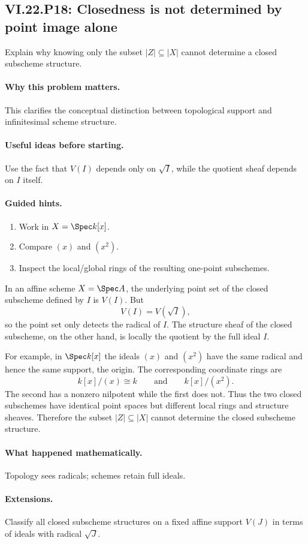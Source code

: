 \subsection*{VI.22.P18: Closedness is not determined by point image alone}
\begin{problem}\label{prob:vi22-p18}
Explain why knowing only the subset $|Z|\subseteq|X|$ cannot determine a closed subscheme structure.
\end{problem}

\ifdefined\FullProblemDossiers
\paragraph{Why this problem matters.}
This clarifies the conceptual distinction between topological support and infinitesimal scheme structure.

\paragraph{Useful ideas before starting.}
Use the fact that $V(I)$ depends only on $\sqrt I$, while the quotient sheaf depends on $I$ itself.

\paragraph{Guided hints.}
\begin{enumerate}
\item Work in $X=\Spec k[x]$.
\item Compare $(x)$ and $(x^2)$.
\item Inspect the local/global rings of the resulting one-point subschemes.
\end{enumerate}

\begin{solution}
In an affine scheme $X=\Spec A$, the underlying point set of the closed
subscheme defined by $I$ is $V(I)$.  But
\[
 V(I)=V(\sqrt I),
\]
so the point set only detects the radical of $I$.  The structure sheaf of the closed subscheme,
on the other hand, is locally the quotient by the full ideal $I$.

For example, in $\Spec k[x]$ the ideals $(x)$ and $(x^2)$ have the same radical and hence the
same support, the origin.  The corresponding coordinate rings are
\[
 k[x]/(x)\cong k
 \qquad\text{and}\qquad
 k[x]/(x^2).
\]
The second has a nonzero nilpotent while the first does not.  Thus the two closed subschemes
have identical point spaces but different local rings and structure sheaves.  Therefore the
subset $|Z|\subseteq|X|$ cannot determine the closed subscheme structure.
\end{solution}

\paragraph{What happened mathematically.}
Topology sees radicals; schemes retain full ideals.

\paragraph{Extensions.}
Classify all closed subscheme structures on a fixed affine support $V(J)$ in terms of ideals with radical $\sqrt J$.
\fi
